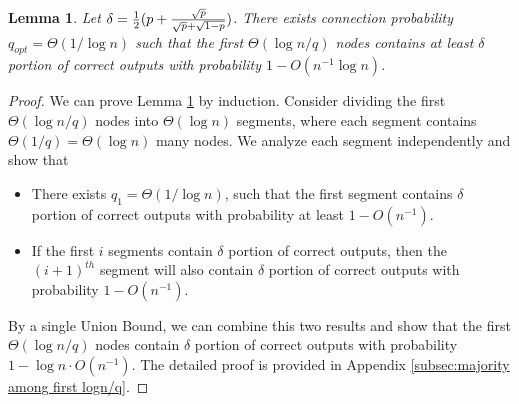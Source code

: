 \documentclass[a4paper,UKenglish]{lipics}
\newtheorem{lem}[thm]{Lemma}
\theoremstyle{definition}
\begin{document}

\begin{lem}
\label{lem:majority among first logn/q}
Let $\delta = {1\over 2}(p + {\sqrt{p}\over \sqrt{p} + \sqrt{1-p}})$.
There exists connection probability $q_{opt} = \Theta(1/\log n)$ such that the first $\Theta(\log n/q)$ nodes 
	contains at least $\delta$ portion of correct outputs with probability $1 - O(n^{-1}\log n)$.
\end{lem}

\begin{proof}
We can prove Lemma \ref{lem:majority among first logn/q} by induction.
Consider dividing the first $\Theta(\log n/q)$ nodes into $\Theta(\log n)$ segments, 
	where each segment contains $\Theta(1/q) = \Theta(\log n)$ many nodes.
We analyze each segment independently and show that 
\begin{itemize}
\item There exists $q_1 = \Theta(1/\log n)$, 
		such that the first segment contains $\delta$ portion of correct outputs with probability at least $1 - O(n^{-1})$.
\item If the first $i$ segments contain $\delta$ portion of correct outputs,
		then the $(i+1)^{th}$ segment will also contain $\delta$ portion of correct outputs with probability $1 - O(n^{-1})$.
\end{itemize}
By a single Union Bound, we can combine this two results and show that
	the first $\Theta(\log n/q)$ nodes contain $\delta$ portion of correct outputs with probability $1 - \log n\cdot O(n^{-1})$.
The detailed proof is provided in Appendix \ref{subsec:majority among first logn/q}.
\end{proof}

\end{document}

